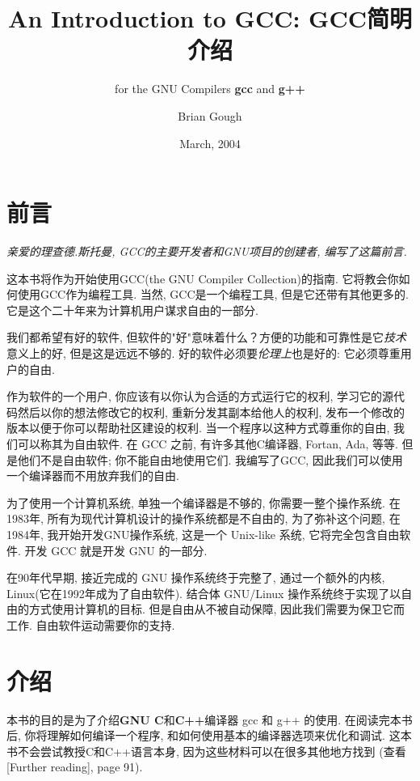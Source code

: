 \documentclass[lang=cn,12pt,newtx,scheme=chinese]{elegantbook}
\title{An Introduction to GCC: GCC简明介绍}
\subtitle{for the GNU Compilers \textbf{gcc} and \textbf{g++}}
\author{Brian Gough}
\date{March, 2004}
\begin{document}
\maketitle
\frontmatter

\tableofcontents
\mainmatter

\chapter*{前言}
\textit{亲爱的理查德.斯托曼, GCC的主要开发者和GNU项目的创建者, 编写了这篇前言.}

\indent 这本书将作为开始使用GCC(the GNU Compiler Collection)的指南. 它将教会你如何使用GCC作为编程工具. 当然, GCC是一个编程工具, 但是它还带有其他更多的. 它是这个二十年来为计算机用户谋求自由的一部分.

\indent 我们都希望有好的软件, 但软件的"好"意味着什么？方便的功能和可靠性是它\textit{技术}意义上的好, 但是这是远远不够的. 好的软件必须要\textit{伦理上}也是好的: 它必须尊重用户的自由.

\indent 作为软件的一个用户, 你应该有以你认为合适的方式运行它的权利, 学习它的源代码然后以你的想法修改它的权利, 重新分发其副本给他人的权利, 发布一个修改的版本以便于你可以帮助社区建设的权利. 当一个程序以这种方式尊重你的自由, 我们可以称其为自由软件. 在 GCC 之前, 有许多其他C编译器, Fortan, Ada, 等等. 但是他们不是自由软件; 你不能自由地使用它们. 我编写了GCC, 因此我们可以使用一个编译器而不用放弃我们的自由.

\indent 为了使用一个计算机系统, 单独一个编译器是不够的, 你需要一整个操作系统. 在1983年, 所有为现代计算机设计的操作系统都是不自由的, 为了弥补这个问题, 在1984年, 我开始开发GNU操作系统, 这是一个 Unix-like 系统, 它将完全包含自由软件. 开发 GCC 就是开发 GNU 的一部分.

\indent 在90年代早期, 接近完成的 GNU 操作系统终于完整了, 通过一个额外的内核, Linux(它在1992年成为了自由软件). 结合体 GNU/Linux 操作系统终于实现了以自由的方式使用计算机的目标. 但是自由从不被自动保障, 因此我们需要为保卫它而工作. 自由软件运动需要你的支持.


\chapter{介绍}
本书的目的是为了介绍\textbf{GNU C}和\textbf{C++}编译器 gcc 和 g++ 的使用. 在阅读完本书后, 你将理解如何编译一个程序, 和如何使用基本的编译器选项来优化和调试. 这本书不会尝试教授C和C++语言本身, 因为这些材料可以在很多其他地方找到 (查看[Further reading], page 91).
\end{document}
